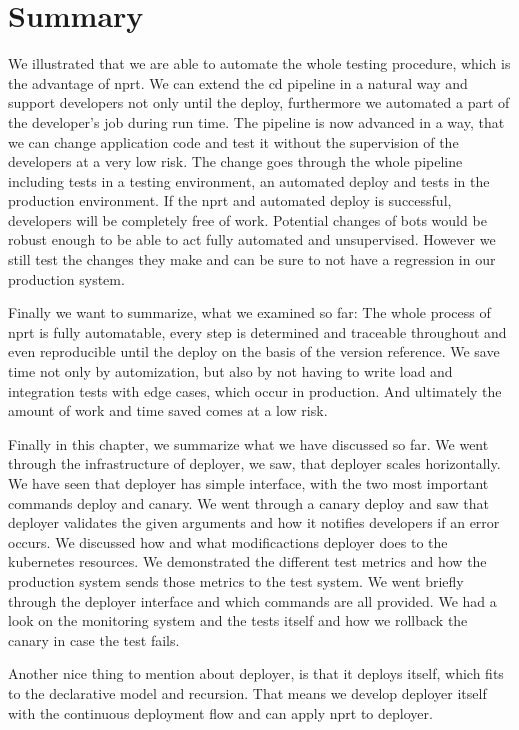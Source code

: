 \section{Summary}

We illustrated that we are able to automate the whole testing procedure, which is the
advantage of \gls{nprt}. We can extend the \gls{cd} pipeline in a natural way and support
developers not only until the deploy, furthermore we automated a part of the developer's
job during run time. The pipeline is now advanced in a way, that we can change application
code and test it without the supervision of the developers at a very low risk. The change
goes through the whole pipeline including tests in a testing environment, an automated
deploy and tests in the production environment. If the \gls{nprt} and automated deploy is
successful, developers will be completely free of work. Potential changes of bots would be
robust enough to be able to act fully automated and unsupervised. However we still test
the changes they make and can be sure to not have a regression in our production system.

Finally we want to summarize, what we examined so far: The whole process of \gls{nprt} is
fully automatable, every step is determined and traceable throughout and even reproducible
until the deploy on the basis of the version reference. We save time not only by
automization, but also by not having to write load and integration tests with edge cases,
which occur in production. And ultimately the amount of work and time saved comes at a low
risk.


Finally in this chapter, we summarize what we have discussed so far. We went through the
infrastructure of deployer, we saw, that deployer scales horizontally. We have seen that
deployer has simple interface, with the two most important commands deploy and canary. We
went through a canary deploy and saw that deployer validates the given arguments and how
it notifies developers if an error occurs. We discussed how and what modificactions
deployer does to the kubernetes resources. We demonstrated the different test metrics and
how the production system sends those metrics to the test system. We went briefly through
the deployer interface and which commands are all provided. We had a look on the
monitoring system and the tests itself and how we rollback the canary in case the test
fails.

Another nice thing to mention about deployer, is that it deploys itself, which fits to the
declarative model and recursion. That means we develop deployer itself with the continuous
deployment flow and can apply \gls{nprt} to deployer.



